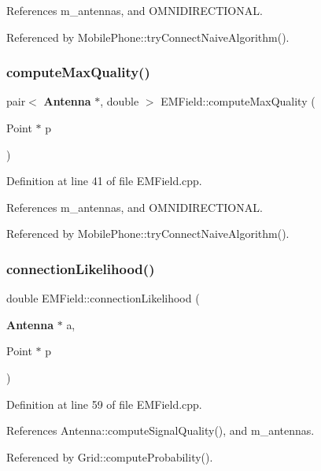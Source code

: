 References m\+\_\+antennas, and O\+M\+N\+I\+D\+I\+R\+E\+C\+T\+I\+O\+N\+AL.



Referenced by Mobile\+Phone\+::try\+Connect\+Naive\+Algorithm().

\mbox{\label{class_e_m_field_ae51a157793b6d59c314b14f3c0b1795c}} 
\subsubsection{computeMaxQuality()}
{\footnotesize\ttfamily pair$<$ \textbf{ Antenna} $\ast$, double $>$ E\+M\+Field\+::compute\+Max\+Quality (\begin{DoxyParamCaption}\item[{Point $\ast$}]{p }\end{DoxyParamCaption})}



Definition at line 41 of file E\+M\+Field.\+cpp.



References m\+\_\+antennas, and O\+M\+N\+I\+D\+I\+R\+E\+C\+T\+I\+O\+N\+AL.



Referenced by Mobile\+Phone\+::try\+Connect\+Naive\+Algorithm().

\mbox{\label{class_e_m_field_abe54bab01ef42cc8b32d6f76b4ccf7a2}} 
\subsubsection{connectionLikelihood()}
{\footnotesize\ttfamily double E\+M\+Field\+::connection\+Likelihood (\begin{DoxyParamCaption}\item[{\textbf{ Antenna} $\ast$}]{a,  }\item[{Point $\ast$}]{p }\end{DoxyParamCaption})}



Definition at line 59 of file E\+M\+Field.\+cpp.



References Antenna\+::compute\+Signal\+Quality(), and m\+\_\+antennas.



Referenced by Grid\+::compute\+Probability().

